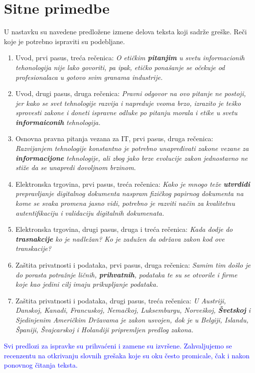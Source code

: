\documentclass[a4paper]{report}
\newcommand{\odgovor}[1]{\textcolor{blue}{#1}}
\begin{document}
\section{Sitne primedbe}
U nastavku su navedene predložene izmene delova teksta koji sadrže greške. Reči koje je potrebno ispraviti su podebljane.
\begin{enumerate}
	\item Uvod, prvi pasus, treća rečenica: \textit{O etičkim \textbf{pitanjim} u svetu informacionih tehonologija nije lako govoriti, pa ipak, etičko ponašanje se očekuje od profesionalaca u gotovo svim granama industrije.}
	\item Uvod, drugi pasus, druga rečenica: \textit{Pravni odgovor na ovo pitanje ne postoji, jer kako se svet tehnologije razvija i napreduje  veoma brzo, izrazito je teško sprovesti zakone i doneti ispravne odluke po pitanju morala i etike u svetu \textbf{informaiconih} tehnologija.}
	\item Osnovna pravna pitanja vezana za IT, prvi pasus, druga rečenica: \textit{Razvijanjem tehnologije konstantno je potrebno unapređivati zakone vezane za \textbf{informacijone} tehnologije, ali zbog jako brze evolucije zakon jednostavno ne stiže da se unapredi dovoljnom brzinom.}
	\item Elektronska trgovina, prvi pasus, treća rečenica: \textit{Kako je mnogo teže \textbf{utvrdidi} prepravljanje digitalnog dokumenta naspram fizičkog papirnog dokumenta na kome se svaka promena jasno vidi, potrebno je razviti način za kvalitetnu autentifikaciju i validaciju digitalnih dokumenata.}
	\item Elektronska trgovina, drugi pasus, druga i treća rečenica: \textit{Kada dodje do \textbf{trasnakcije} ko je nadležan? Ko je zadužen da održava zakon kod ove transkacije?}
	\item Zaštita privatnosti i podataka, prvi pasus, druga rečenica: \textit{Samim tim došlo je do porasta potražnje ličnih, \textbf{prihvatnih}, podataka te su se otvorile i firme koje kao jedini cilj imaju prikupljanje podataka.}
	\item Zaštita privatnosti i podataka, drugi pasus, treća rečenica: \textit{U Austriji, Danskoj, Kanadi, Francuskoj, Nemačkoj, Luksemburgu, Norveškoj, \textbf{Švetskoj} i Sjedinjenim Američkim Državama je zakon usvojen, dok je u Belgiji, Islandu, Španiji, Švajcarskoj i Holandiji pripremljen predlog zakona.}
\end{enumerate}
\odgovor{Svi predlozi za ispravke su prihvaćeni i zamene su izvršene. Zahvaljujemo se recenzentu na otkrivanju slovnih grešaka koje su oku često promicale, čak i nakon ponovnog čitanja teksta. }
\end{document}
